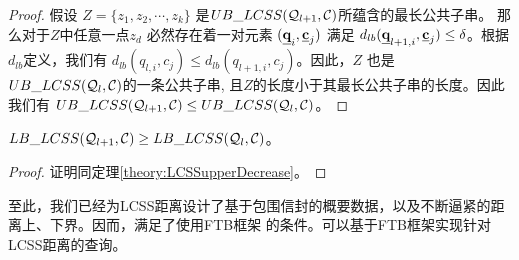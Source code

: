 \begin{proof}\label{proof:LCSSDecrease}
假设 $Z=\{ z_{1}, z_{2}, \cdots, z_{k}\}$ 是$UB\_LCSS ({\cal Q}_{l+1}, {\cal C})$所蕴含的最长公共子串。
那么对于$Z$中任意一点$z_{d}$ 必然存在着一对元素 $(\emph{{\textbf{q}}}_{i}, \emph{{\textbf{c}}}_{j})$ 满足 $d_{lb}(\emph{{\textbf{q}}}_{l+1,i}, \emph{{\textbf{c}}}_{j}) \le \delta$。根据$d_{lb}$定义，我们有 $d_{lb}(q_{l,i}, c_{j}) \le d_{lb}(q_{l+1,i}, c_{j})$。因此，$Z$ 也是 $UB\_LCSS({\cal Q}_{l}, {\cal C})$的一条公共子串, 且$Z$的长度小于其最长公共子串的长度。因此我们有
$UB\_LCSS({\cal Q}_{l+1}, {\cal C})\le UB\_LCSS({\cal Q}_{l}, {\cal C})$。 
\end{proof}
\begin{theorem}\label{theory:LCSSlowerDecrease}
$LB\_LCSS({\cal Q}_{l+1}, {\cal C}) \ge LB\_LCSS({\cal Q}_{l}, {\cal C}) $。
\end{theorem}  
\begin{proof}
证明同定理\ref{theory:LCSSupperDecrease}。
\end{proof}

至此，我们已经为LCSS距离设计了基于包围信封的概要数据，以及不断逼紧的距离上、下界。因而，满足了使用FTB框架 的条件。可以基于FTB框架实现针对LCSS距离的查询。
 \clearpage
 \phantom{s}
 \clearpage

